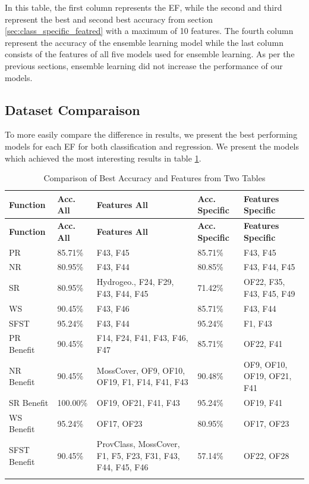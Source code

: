 \documentclass[12pt,letterpaper]{article}
\begin{document}


In this table, the first column represents the \ac{EF}, while the second and third represent the best and second best accuracy from section \ref{sec:class_specific_featred} with a maximum of 10 features.
The fourth column represent the accuracy of the ensemble learning model while the last column consists of the features of all five models used for ensemble learning.
As per the previous sections, ensemble learning did not increase the performance of our models.





\subsection{Dataset Comparaison}
To more easily compare the difference in results, we present the best performing models for each \ac{EF} for both classification and regression.
We present the models which achieved the most interesting results in table \ref{tab_combined:featred_accuracy}.

\begin{longtable}{|p{3cm}|p{2cm}|p{3cm}|p{2cm}|p{3cm}|}
\hline
\textbf{Function} & \textbf{Acc. All} & \textbf{Features All} & \textbf{Acc. Specific} & \textbf{Features Specific} \\ \hline
\endfirsthead
\hline
\textbf{Function} & \textbf{Acc. All} & \textbf{Features All} & \textbf{Acc. Specific} & \textbf{Features Specific} \\ \hline
\endhead

PR & 85.71\% & F43, F45 & 85.71\% & F43, F45 \\ \hline
NR & 80.95\% & F43, F44 & 80.85\% & F43, F44, F45 \\ \hline
SR & 80.95\% & Hydrogeo., F24, F29, F43, F44, F45 & 71.42\% & OF22, F35, F43, F45, F49 \\ \hline
WS & 90.45\% & F43, F46 & 85.71\% & F43, F44 \\ \hline
SFST & 95.24\% & F43, F44 & 95.24\% & F1, F43 \\ \hline
PR Benefit & 90.45\% & F14, F24, F41, F43, F46, F47 & 85.71\% & OF22, F41 \\ \hline
NR Benefit & 90.45\% & MossCover, OF9, OF10, OF19, F1, F14, F41, F43 & 90.48\% & OF9, OF10, OF19, OF21, F41 \\ \hline
SR Benefit & 100.00\% & OF19, OF21, F41, F43 & 95.24\% & OF19, F41 \\ \hline
WS Benefit & 95.24\% & OF17, OF23 & 80.95\% & OF17, OF23 \\ \hline
SFST Benefit & 90.45\% & ProvClass, MossCover, F1, F5, F23, F31, F43, F44, F45, F46 & 57.14\% & OF22, OF28 \\ \hline
\caption{Comparison of Best Accuracy and Features from Two Tables}
\label{tab_combined:featred_accuracy}
\end{longtable}
\end{document}
